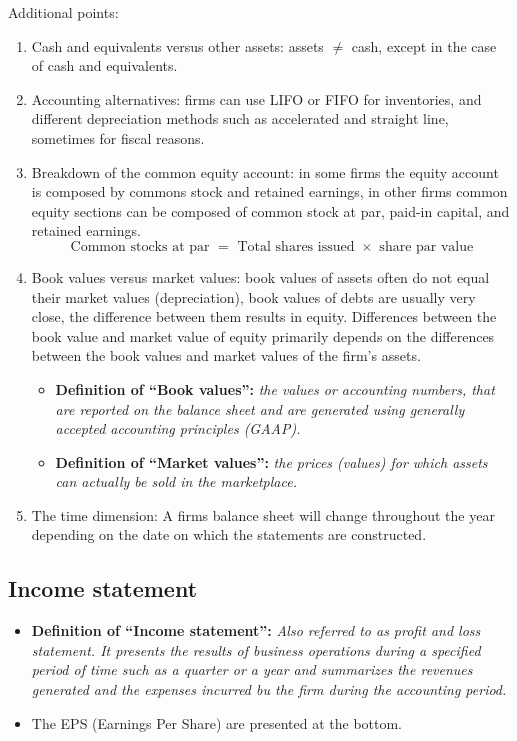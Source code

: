 \documentclass{article}
\renewcommand{\termdefinition}[2]{
    \textbf{Definition of ``#1'':} \emph{#2}
}
\begin{document}
Additional points:
\begin{enumerate}
    \item Cash and equivalents versus other assets: assets $\neq$ cash, except in the case of cash and equivalents.
    \item Accounting alternatives: firms can use LIFO or FIFO for inventories, and different depreciation methods such as accelerated and straight line, sometimes for fiscal reasons. 
    \item Breakdown of the common equity account: in some firms the equity account is composed by commons stock and retained earnings, in other firms common equity sections can be composed of common stock at par, paid-in capital, and retained earnings. 
        \[
          \text{ Common stocks at par }= \text{ Total shares issued }\times \text{ share par value }
        \]
    
    \item Book values versus market values: book values of assets often do not equal their market values (depreciation), book values of debts are usually very close, the difference between them results in equity. Differences between the book value and market value of equity primarily depends on the differences between the book values and market values of the firm's assets. 
        \begin{itemize}
            \item \termdefinition{Book values}{ the values or accounting numbers, that are reported on the balance sheet and are generated using generally accepted accounting principles (GAAP).} 
            \item \termdefinition{Market values}{ the prices (values) for which assets can actually be sold in the marketplace. } 
        \end{itemize}
    
    \item The time dimension: A firms balance sheet will change throughout the year depending on the date on which the statements are constructed.
\end{enumerate}

\subsection{Income statement}
\begin{itemize}
    \item \termdefinition{Income statement}{ Also referred to as profit and loss statement. It presents the results of business operations during a specified period of time such as a quarter or a year and summarizes the revenues generated and the expenses incurred bu the firm during the accounting period.} 
    \item The EPS (Earnings Per Share) are presented at the bottom. 
\end{itemize}
\end{document}
